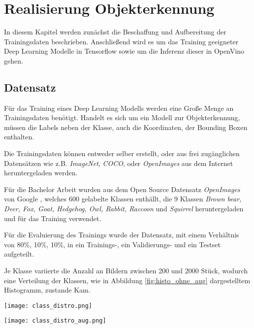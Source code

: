 \chapter{Realisierung Objekterkennung}\label{kap:object_det}

In diesem Kapitel werden zunächst die Beschaffung und Aufbereitung 
der Trainingsdaten beschrieben. Anschließend wird es um das 
Training geeigneter Deep Learning Modelle in Tensorflow sowie 
um die Inferenz dieser in OpenVino gehen.

\section{Datensatz}\label{sec:dataset}

Für das Training eines Deep Learning Modells werden 
eine Große Menge an Trainingsdaten benötigt.
Handelt es sich um ein Modell zur Objekterkennung,
müssen die Labels neben der Klasse, auch die Koordinaten, 
der Bounding Boxen enthalten.

Die Trainingsdaten können entweder selber erstellt, oder 
aus frei zugänglichen Datensätzen wie z.B. \textit{ImageNet}, 
\textit{COCO}, oder \textit{OpenImages}
aus dem Internet heruntergeladen werden.

Für die Bachelor Arbeit wurden aus dem Open Source Datensatz
\textit{OpenImages} von Google
\cite{kuznetsovaOpenImagesDataset2018}, 
welches 600 gelabelte Klassen enthällt, 
die 9 Klassen \textit{Brown bear, Deer, Fox, Goat, 
Hedgehog, Owl, Rabbit, Raccoon} und \textit{Squirrel}
heruntergeladen und für das Training verwendet.

Für die Evaluierung des Trainings wurde der 
Datensatz, mit einem Verhältnis von 80\%, 10\%, 10\%, in ein
Trainings-, ein Validierungs- und ein 
Testset aufgeteilt.

Je Klasse variierte die Anzahl an Bildern zwischen 200 und 
2000 Stück, wodurch eine Verteilung der Klassen, 
wie in  Abbildung \ref{fig:histo_ohne_aug} dargestelltem Histogramm,
zustande Kam.

\vspace{1cm}
\begin{minipage}{0.5\textwidth}
    \centering
    \texttt{[image: class\_distro.png]}
    \label{fig:histo_ohne_aug}
\end{minipage}
\begin{minipage}{0.5\textwidth}
    \centering
    \texttt{[image: class\_distro\_aug.png]}
    \label{fig:histo_mit_aug}
\end{minipage}
\vspace{1cm}

